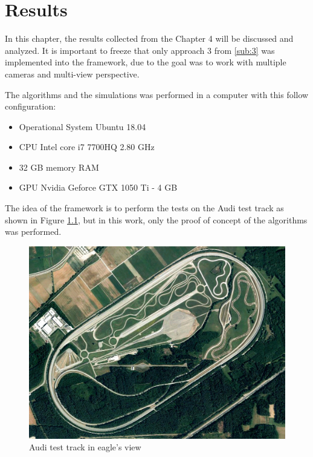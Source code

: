 \chapter{Results}
\label{capitulo5}

In this chapter, the results collected from the Chapter 4 will be discussed and analyzed. It is important to freeze that only approach 3 from \ref{sub:3} was implemented into the framework, due to the goal was to work with multiple cameras and multi-view perspective.

The algorithms and the simulations was performed in a computer with this follow configuration:

\begin{itemize}
    \item Operational System Ubuntu 18.04
    \item CPU Intel core i7 7700HQ 2.80 GHz
    \item 32 GB memory RAM
    \item GPU Nvidia Geforce GTX 1050 Ti - 4 GB
\end{itemize}


The idea of the framework is to perform the tests on the Audi test track as shown in Figure \ref{fig:test_track}, but in this work, only the proof of concept of the algorithms was performed. 

\begin{figure}[H]
\centering
\includegraphics[scale=0.3]{imagens/testtrack.jpg}
\caption{Audi test track in eagle's view}
\label{fig:test_track}
\end{figure}



